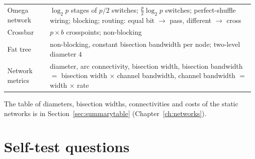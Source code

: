 \begin{center}
\begin{tabularx}{\linewidth}{@{}l X@{}}
Omega network & $\log_2p$ stages of $p/2$ switches; $\tfrac p2\log_2 p$ switches; perfect-shuffle wiring; blocking; routing: equal bit $\to$ pass, different $\to$ cross\\
Crossbar & $p\times b$ crosspoints; non-blocking\\
Fat tree & non-blocking, constant bisection bandwidth per node; two-level diameter $4$\\
Network metrics & diameter, arc connectivity, bisection width, bisection bandwidth $=$ bisection width $\times$ channel bandwidth, channel bandwidth $=$ width $\times$ rate\\
\bottomrule
\end{tabularx}
\end{center}

The table of diameters, bisection widths, connectivities and costs of the static networks is in Section~\ref{sec:summarytable} (Chapter~\ref{ch:networks}).

\section{Self-test questions}

